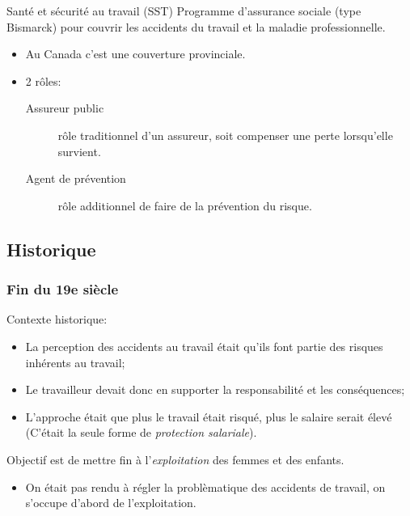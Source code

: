 \documentclass[10pt, french]{article}
\begin{document}
\begin{multicols*}{3}
\begin{conceptgen}{Santé et sécurité au travail (SST)}
Programme d'assurance sociale (type Bismarck) pour couvrir les accidents du travail et la maladie professionnelle. 
\begin{itemize}[leftmargin = *]
	\item	Au Canada c'est une couverture provinciale.
	\item	2 rôles:
		\begin{description}
		\item[Assureur public]	rôle traditionnel d'un assureur, soit compenser une perte lorsqu'elle survient.
		\item[Agent de prévention]	rôle additionnel de faire de la prévention du risque.
		\end{description}
\end{itemize}
\end{conceptgen}


\subsection{Historique}
\subsubsection*{Fin du 19e siècle}

Contexte historique:
\begin{itemize}[leftmargin = *]
	\item	La perception des accidents au travail était qu'ils font partie des risques inhérents au travail;
	\item	Le travailleur devait donc en supporter la responsabilité et les conséquences;
	\item	L'approche était que plus le travail était risqué, plus le salaire serait élevé (C'était la seule forme de \textit{protection salariale}).
\end{itemize}

\begin{rappel_enhanced}
Objectif est de mettre fin à l'\textit{exploitation} des femmes et des enfants.

\begin{itemize}[leftmargin = *]
\item	On était pas rendu à régler la problèmatique des accidents de travail, on s'occupe d'abord de l'exploitation.
\end{itemize}
\end{rappel_enhanced}


\end{multicols*}
\end{document}
